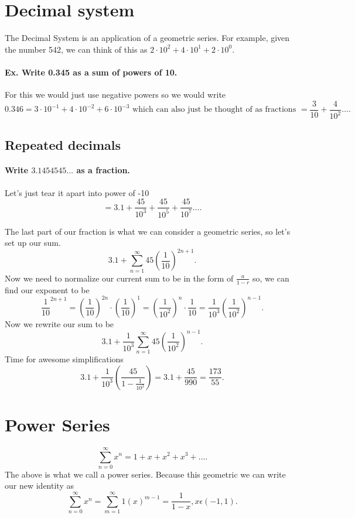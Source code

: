 \section{Decimal system}%
\label{sec:Decimal system}
The Decimal System is an application of a geometric series. For example, given the number 542, we can think of this as $ 2\cdot 10^{ 2 }+4\cdot 10^{ 1 }+2\cdot 10^{ 0 } $.

\paragraph{Ex. Write 0.345 as a sum of powers of 10. }

For this we would just use negative powers so we would write 
\[
0.346 = 3\cdot 10^{ -1 }+4\cdot 10^{ -2 }+6 \cdot 10^{ -3 } \text{ which can also just be thought of as fractions }= \frac{ 3 }{ 10 } +\frac{ 4 }{ 10^2 } \ldots
.\] 

\subsection{Repeated decimals}%
\label{sub:Repeated decimals}
\paragraph{Write $ 3.1454545\ldots $ as a fraction. }
Let's just tear it apart into power of -10
\[
=3.1 + \frac{ 45 }{ 10^{ 3 } } +\frac{ 45 }{ 10^{ 5 } } +\frac{ 45 }{ 10^{ 7 } } \ldots
.\] 

The last part of our fraction is what we can consider a geometric series, so let's set up our sum.
\[
3.1+\sum_{ n=1 } ^{ \infty } 45\left( \frac{ 1 }{ 10 }  \right) ^{ 2n+1 }
.\] 
Now we need to normalize our current sum to be in the form of $ \frac{ a }{ 1-r } $ so, we can find our exponent to be 
\[
\frac{ 1 }{ 10 } ^{ 2n+1 }=\left( \frac{ 1 }{ 10 }  \right) ^{ 2n }\cdot \left( \frac{ 1 }{ 10 }  \right) ^{ 1 }=\left( \frac{ 1 }{ 10^2 }  \right) ^{ n }\cdot \frac{ 1 }{ 10 } =\frac{ 1 }{ 10^3 } \left( \frac{ 1 }{ 10^2 }  \right)^{ n-1 }
.\] 
Now we rewrite our sum to be 
\[
3.1+\frac{ 1 }{ 10^3 } \sum_{ n=1 } ^{ \infty } 45\left( \frac{ 1 }{ 10^2 }  \right) ^{ n-1 }
.\] 
Time for awesome simplifications
\[
3.1+\frac{ 1 }{ 10^3 } \left( \frac{ 45 }{ 1-\frac{ 1 }{ 10^2 }  }  \right)=3.1+ \frac{ 45 }{ 990 } = \frac{ 173 }{ 55 }  
.\] 

\section{Power Series}%
\label{sec:Power Series}
\[
\sum_{ n= 0 } ^{ \infty } x^{ n } = 1 + x + x^2+x^3+ \ldots
.\] 
The above is what we call a power series. Because this geometric we can write our new identity as 
\[
\sum_{ n=0 } ^{ \infty } x^{ n }=\sum_{ m=1 } ^{ \infty } 1\left( x \right) ^{ m-1 }=\frac{ 1 }{ 1-x } ,x\epsilon\left( -1,1 \right) 
.\] 

